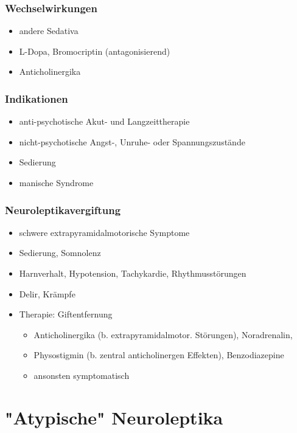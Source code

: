 \documentclass[10pt,a4paper]{report}
\begin{document}
\subsubsection{Wechselwirkungen} %
\label{ssub:wechselwirkungen}
\begin{itemize}
	\item andere Sedativa
	\item L-Dopa, Bromocriptin (antagonisierend)
	\item Anticholinergika
\end{itemize}
\subsubsection{Indikationen} %
\label{ssub:indikationen}
\begin{itemize}
	\item anti-psychotische Akut- und Langzeittherapie
	\item nicht-psychotische Angst-, Unruhe- oder Spannungszustände
	\item Sedierung
	\item manische Syndrome
\end{itemize}
\subsubsection{Neuroleptikavergiftung} %
\label{ssub:neuroleptikavergiftung}
\begin{itemize}
	\item schwere extrapyramidalmotorische Symptome
	\item Sedierung, Somnolenz
	\item Harnverhalt, Hypotension, Tachykardie, Rhythmusstörungen
	\item Delir, Krämpfe
	\item Therapie: Giftentfernung
		\begin{itemize}
			\item Anticholinergika (b. extrapyramidalmotor. Störungen), Noradrenalin, 
			\item Physostigmin (b. zentral anticholinergen Effekten), Benzodiazepine
			\item ansonsten symptomatisch
		\end{itemize}	
\end{itemize}
\section{"Atypische" Neuroleptika} %
\label{sec:section_name}
\end{document}
